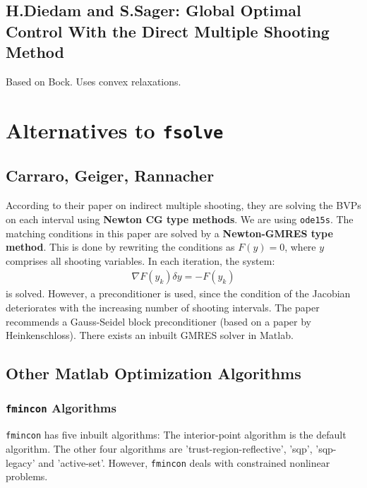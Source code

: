 \documentclass[11pt, a4paper]{article}
\theoremstyle{definition}
\begin{document}
\subsection{H.Diedam and S.Sager: Global Optimal Control With the Direct Multiple Shooting Method}
Based on Bock. Uses convex relaxations.



\section{Alternatives to \texttt{fsolve}}

\subsection{Carraro, Geiger, Rannacher}
According to their paper on indirect multiple shooting, they are solving the BVPs on each interval using \textbf{Newton CG type methods}. We are using \texttt{ode15s}. The matching conditions in this paper are solved by a \textbf{Newton-GMRES type method}. This is done by rewriting the conditions as $F(y)=0$, where $y$ comprises all shooting variables.
In each iteration, the system:
\begin{align*}
\nabla F(y_k) \delta y= - F(y_k)
\end{align*}
is solved.
However, a preconditioner is used, since the condition of the Jacobian deteriorates with the increasing number of shooting intervals. The paper recommends a Gauss-Seidel block preconditioner (based on a paper by Heinkenschloss).
There exists an inbuilt GMRES solver in Matlab.

\subsection{Other Matlab Optimization Algorithms}

\subsubsection{\texttt{fmincon} Algorithms}
\texttt{fmincon} has five inbuilt algorithms:
The interior-point algorithm is the default algorithm. The other four algorithms are 'trust-region-reflective', 'sqp', 'sqp-legacy' and 'active-set'.
However, \texttt{fmincon} deals with constrained nonlinear problems.
\end{document}
